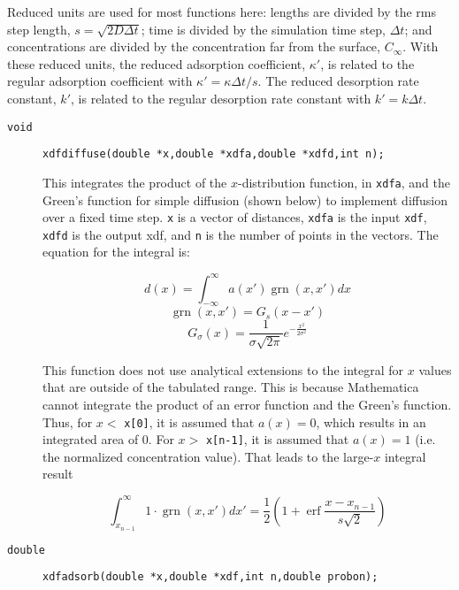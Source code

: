 \documentclass[11pt]{article}
\newcommand {\ttt} {\texttt}
\DeclareMathOperator{\erf}{erf}
\DeclareMathOperator{\grn}{grn}
\begin{document}
Reduced units are used for most functions here: lengths are divided by the rms step length, $s = \sqrt{2D \Delta t}$; time is divided by the simulation time step, $\Delta t$; and concentrations are divided by the concentration far from the surface, $C_\infty$. With these reduced units, the reduced adsorption coefficient, $\kappa'$, is related to the regular adsorption coefficient with $\kappa' = \kappa \Delta t/s$. The reduced desorption rate constant, $k'$, is related to the regular desorption rate constant with $k' = k \Delta t$.

\begin{description}

\item[\ttt{void}] 
\ttt{xdfdiffuse(double *x,double *xdfa,double *xdfd,int n);}

This integrates the product of the $x$-distribution function, in \ttt{xdfa}, and the Green's function for simple diffusion (shown below) to implement diffusion over a fixed time step. \ttt{x} is a vector of distances, \ttt{xdfa} is the input \ttt{xdf}, \ttt{xdfd} is the output xdf, and \ttt{n} is the number of points in the vectors. The equation for the integral is:

$$d(x) = \int_{-\infty}^{\infty} a(x') \grn(x,x') dx$$
$$\grn(x,x') = G_s(x-x')$$
$$G_{\sigma}(x) = \frac{1}{\sigma \sqrt{2 \pi}}e^{-\frac{x^2}{2\sigma^2}}$$

This function does not use analytical extensions to the integral for $x$ values that are outside of the tabulated range. This is because Mathematica cannot integrate the product of an error function and the Green's function. Thus, for $x <$ \ttt{x[0]}, it is assumed that $a(x) = 0$, which results in an integrated area of 0. For $x >$ \ttt{x[n-1]}, it is assumed that $a(x) = 1$ (i.e. the normalized concentration value). That leads to the large-$x$ integral result

$$\int_{x_{n-1}}^{\infty} 1 \cdot \grn(x,x') dx' = \frac{1}{2} \left(1+\erf \frac{x-x_{n-1}}{s\sqrt{2}} \right)$$


\item[\ttt{double}] 
\ttt{xdfadsorb(double *x,double *xdf,int n,double probon);}


\end{description}
\end{document}
